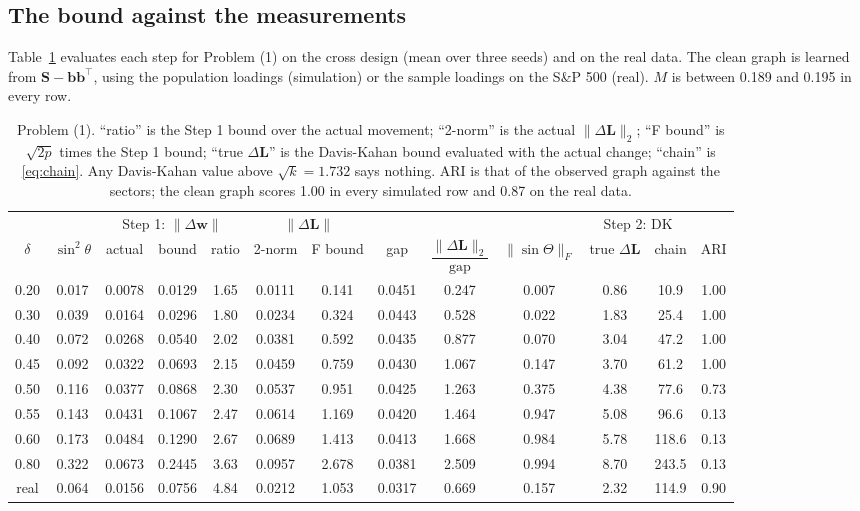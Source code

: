 \documentclass[11pt,a4paper]{article}
\newcommand{\Lap}{\mathbf{L}}
\newcommand{\Smat}{\mathbf{S}}
\newcommand{\bvec}{\mathbf{b}}
\newcommand{\wvec}{\mathbf{w}}
\theoremstyle{remark}
\begin{document}
\subsection{The bound against the measurements}\label{sec:boundcheck}

Table~\ref{tab:bound} evaluates each step for Problem (1) on the cross design (mean over
three seeds) and on the real data. The clean graph is learned from
$\Smat-\bvec\bvec^\top$, using the population loadings (simulation) or the sample loadings
on the S\&P 500 (real). $M$ is between 0.189 and 0.195 in every row.

\begin{table}[htbp]
\centering\footnotesize\setlength{\tabcolsep}{3pt}
\begin{tabular}{ccccccccccccc}
\toprule
 & & \multicolumn{3}{c}{Step 1: $\lVert\Delta\wvec\rVert$} & \multicolumn{2}{c}{$\lVert\Delta\Lap\rVert$} & & & & \multicolumn{2}{c}{Step 2: DK} & \\
\cmidrule(lr){3-5}\cmidrule(lr){6-7}\cmidrule(lr){11-12}
$\delta$ & $\sin^2\theta$ & actual & bound & ratio & 2-norm & F bound & gap & $\dfrac{\lVert\Delta\Lap\rVert_2}{\mathrm{gap}}$ & $\lVert\sin\Theta\rVert_F$ & true $\Delta\Lap$ & chain & ARI \\
\midrule
0.20 & 0.017 & 0.0078 & 0.0129 & 1.65 & 0.0111 & 0.141 & 0.0451 & 0.247 & 0.007 & 0.86 & 10.9 & 1.00 \\
0.30 & 0.039 & 0.0164 & 0.0296 & 1.80 & 0.0234 & 0.324 & 0.0443 & 0.528 & 0.022 & 1.83 & 25.4 & 1.00 \\
0.40 & 0.072 & 0.0268 & 0.0540 & 2.02 & 0.0381 & 0.592 & 0.0435 & 0.877 & 0.070 & 3.04 & 47.2 & 1.00 \\
0.45 & 0.092 & 0.0322 & 0.0693 & 2.15 & 0.0459 & 0.759 & 0.0430 & 1.067 & 0.147 & 3.70 & 61.2 & 1.00 \\
0.50 & 0.116 & 0.0377 & 0.0868 & 2.30 & 0.0537 & 0.951 & 0.0425 & 1.263 & 0.375 & 4.38 & 77.6 & 0.73 \\
0.55 & 0.143 & 0.0431 & 0.1067 & 2.47 & 0.0614 & 1.169 & 0.0420 & 1.464 & 0.947 & 5.08 & 96.6 & 0.13 \\
0.60 & 0.173 & 0.0484 & 0.1290 & 2.67 & 0.0689 & 1.413 & 0.0413 & 1.668 & 0.984 & 5.78 & 118.6 & 0.13 \\
0.80 & 0.322 & 0.0673 & 0.2445 & 3.63 & 0.0957 & 2.678 & 0.0381 & 2.509 & 0.994 & 8.70 & 243.5 & 0.13 \\
\midrule
real & 0.064 & 0.0156 & 0.0756 & 4.84 & 0.0212 & 1.053 & 0.0317 & 0.669 & 0.157 & 2.32 & 114.9 & 0.90 \\
\bottomrule
\end{tabular}
\caption{Problem (1). ``ratio'' is the Step 1 bound over the actual movement; ``2-norm''
is the actual $\lVert\Delta\Lap\rVert_2$; ``F bound'' is $\sqrt{2p}$ times the Step 1
bound; ``true $\Delta\Lap$'' is the Davis-Kahan bound evaluated with the actual change;
``chain'' is \eqref{eq:chain}. Any Davis-Kahan value above $\sqrt k=1.732$ says nothing.
ARI is that of the observed graph against the sectors; the clean graph scores 1.00 in
every simulated row and 0.87 on the real data.}
\label{tab:bound}
\end{table}
\end{document}
